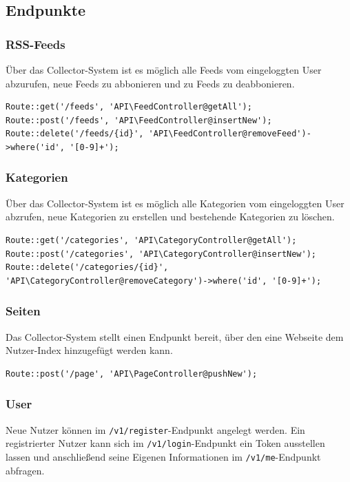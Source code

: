     \subsection{Endpunkte}
        
        \subsubsection{RSS-Feeds}
            Über das Collector-System ist es möglich alle Feeds vom eingeloggten User abzurufen, neue Feeds zu abbonieren und zu Feeds zu deabbonieren.
        
            \begin{lstlisting}
Route::get('/feeds', 'API\FeedController@getAll');
Route::post('/feeds', 'API\FeedController@insertNew');
Route::delete('/feeds/{id}', 'API\FeedController@removeFeed')->where('id', '[0-9]+');
            \end{lstlisting}
        
        \subsubsection{Kategorien}
            Über das Collector-System ist es möglich alle Kategorien vom eingeloggten User abzrufen, neue Kategorien zu erstellen und bestehende Kategorien zu löschen.
        
            \begin{lstlisting}
Route::get('/categories', 'API\CategoryController@getAll');
Route::post('/categories', 'API\CategoryController@insertNew');
Route::delete('/categories/{id}', 'API\CategoryController@removeCategory')->where('id', '[0-9]+');
            \end{lstlisting}
        
        \subsubsection{Seiten}
            Das Collector-System stellt einen Endpunkt bereit, über den eine Webseite dem Nutzer-Index hinzugefügt werden kann.
            \begin{lstlisting}
Route::post('/page', 'API\PageController@pushNew');
            \end{lstlisting}

        \subsubsection{User}
            Neue Nutzer können im \texttt{/v1/register}-Endpunkt angelegt werden. Ein registrierter Nutzer kann sich im \texttt{/v1/login}-Endpunkt ein Token ausstellen lassen und anschließend seine Eigenen Informationen im \texttt{/v1/me}-Endpunkt abfragen.
            
